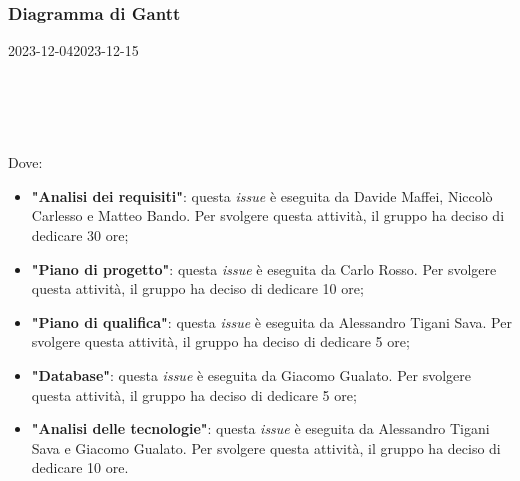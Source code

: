 \subsubsection{Diagramma di Gantt}

\begin{ganttchart}[
		x unit=0.6cm, %
		y unit chart=0.6cm,
		bar/.style={fill=blue!50},
		bar height=0.5,
		time slot format=isodate,
		time slot unit=day,
		vgrid,
		today=2023-12-04,
		today rule/.style={draw=red, ultra thick}
	]{2023-12-04}{2023-12-15}
	 \\
	 \\
	 \\
	 \\
	 \\
\end{ganttchart}

Dove:
\begin{itemize}
	\item \textbf{"Analisi dei requisiti"}: questa \textit{issue} è eseguita da
	      Davide Maffei, Niccolò Carlesso e Matteo Bando. Per
	      svolgere questa attività, il gruppo ha deciso di dedicare 30 ore;

	\item \textbf{"Piano di progetto"}: questa \textit{issue} è eseguita da
	      Carlo Rosso. Per svolgere questa attività, il gruppo ha deciso
	      di dedicare 10 ore;

	\item \textbf{"Piano di qualifica"}: questa \textit{issue} è eseguita da
	      Alessandro Tigani Sava. Per svolgere questa attività, il gruppo ha
	      deciso di dedicare 5 ore;

	\item \textbf{"Database"}: questa \textit{issue} è eseguita da Giacomo
	      Gualato. Per svolgere questa attività, il gruppo ha deciso di
	      dedicare 5 ore;

	\item \textbf{"Analisi delle tecnologie"}: questa \textit{issue} è eseguita
	      da Alessandro Tigani Sava e Giacomo Gualato. Per svolgere questa
	      attività, il gruppo ha deciso di dedicare 10 ore.
\end{itemize}

